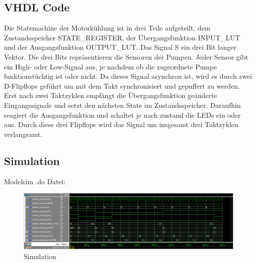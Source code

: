 \subsection{VHDL Code}

\sloppy

Die Statemachine der Motorkühlung ist in drei Teile aufgeteilt, dem Zustandsspeicher \glqq STATE\_REGISTER\grqq{}, der Übergangsfunktion \glqq INPUT\_LUT\grqq{} und der Ausgangsfunktion \glqq OUTPUT\_LUT\grqq{}. Das Signal \glqq S\grqq{} ein drei Bit langer Vektor. Die drei Bits repräsentieren die Sensoren der Pumpen. Jeder Sensor gibt ein High- oder Low-Signal aus, je nachdem ob die zugeordnete Pumpe funktionstüchtig ist oder nicht. Da dieses Signal asynchron ist, wird es durch zwei D-Flipflops geführt um mit dem Takt synchronisiert und gepuffert zu werden. Erst nach zwei Taktzyklen empfängt die Übergangsfunktion geänderte Eingangssignale und setzt den nächsten State im Zustandsspeicher. Daraufhin reagiert die Ausgangsfunktion und schaltet je nach zustand die LEDs ein oder aus. Durch diese drei Flipflops wird das Signal um insgesamt drei Taktzyklen verlangsamt.
 


\subsection{Simulation}

Modelsim .do Datei:



\begin{figure}[H]
    \begin{center}
        \includegraphics[width=1\textwidth]{img/dip3_sim.png}
        \caption{Simulation}
        \label{fig:A1_sim}
    \end{center}
\end{figure}

